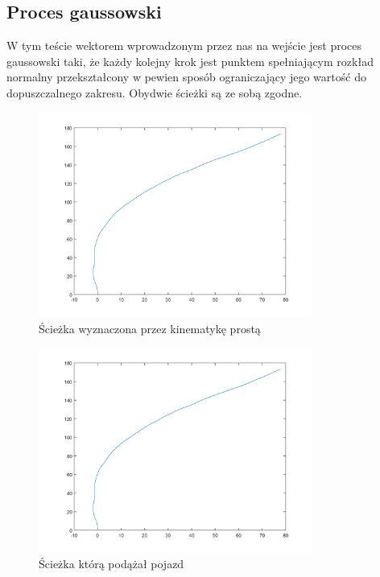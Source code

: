 \documentclass[a4paper, 12pt]{report}
\begin{document}
			\subsection{Proces gaussowski}
				W tym teście wektorem wprowadzonym przez nas na wejście jest proces gaussowski taki, że każdy kolejny krok jest punktem spełniającym rozkład normalny przekształcony w pewien sposób ograniczający jego wartość do dopuszczalnego zakresu. Obydwie ścieżki są ze sobą zgodne.
				\begin{figure}[H]
					\centering
					\includegraphics[width = 0.8\textwidth]{./AP/img/random_gauss_in_1.png}
					\caption{Ścieżka wyznaczona przez kinematykę prostą}
				\end{figure}
				\begin{figure}[H]
					\centering
					\includegraphics[width = 0.8\textwidth]{./AP/img/random_gauss_in_2.png}
					\caption{Ścieżka którą podążał pojazd}
				\end{figure}
\end{document}

